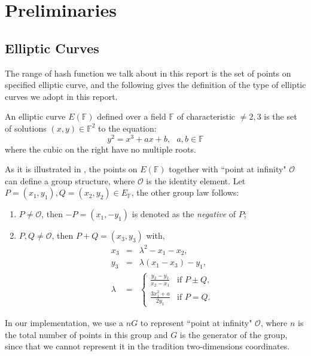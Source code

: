 \section{Preliminaries}

\subsection{Elliptic Curves}
The range of hash function we talk about in this report is the set of points on
specified elliptic
curve, and the following gives the definition of the type of elliptic curves we
adopt in this report.
\begin{defn}
An elliptic curve $E(\mathbb{F})$ defined over a field $\mathbb{F}$ of characteristic $\neq 2, 3$ 
is the set of solutions $(x, y) \in \mathbb{F}^2$ to the equation:
\begin{equation}
y^2=x^3+ax+b, \ \ \ a, b \in \mathbb{F}
\end{equation}
where the cubic on the right have no multiple roots.
\end{defn}

As it is illustrated in \cite{koblitz1987elliptic}, the points on $E(\mathbb{F})$
together with ``point at infinity" $\mathcal{O}$ can define a group structure,
where $\mathcal{O}$ is the identity element.
Let $P = (x_1, y_1), Q = (x_2, y_2) \in E_\mathbb{F}$, the other group law follows:
\begin{enumerate}
\item $P \neq \mathcal{O}$, then $-P = (x_1, -y_1)$ is denoted
as the \emph{negative} of $P$;
\item $P, Q \neq \mathcal{O}$, then $P+Q=(x_3, y_3)$ with,
\begin{equation}
\label{groupPlus}
\begin{array}{lll}
x_3 & = & \lambda^2-x_1-x_2, \\
y_3 & = & \lambda(x_1-x_3) - y_1, \\
\lambda & = &
\left\{
\begin{array}{ll}
\frac{y_2-y_1}{x_2-x_1} & \mbox{if\ } P \pm Q,\\
\frac{3x_1^2+a}{2y_1}   & \mbox{if\ } P = Q.
\end{array}
\right.
\end{array}
\end{equation}
\end{enumerate}
\par In our implementation, we use a $nG$ to represent ``point at
infinity" $\mathcal{O}$, where $n$ is the total number of points in this group
and $G$ is the generator of the group, since that we cannot represent it in the tradition
two-dimensions coordinates.

